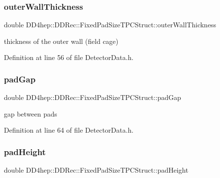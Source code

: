 \subsubsection{\texorpdfstring{outer\+Wall\+Thickness}{outerWallThickness}}
{\footnotesize\ttfamily double D\+D4hep\+::\+D\+D\+Rec\+::\+Fixed\+Pad\+Size\+T\+P\+C\+Struct\+::outer\+Wall\+Thickness}



thickness of the outer wall (field cage) 



Definition at line 56 of file Detector\+Data.\+h.

\hypertarget{struct_d_d4hep_1_1_d_d_rec_1_1_fixed_pad_size_t_p_c_struct_a28e26e987689e132b295e84586133520}{}\label{struct_d_d4hep_1_1_d_d_rec_1_1_fixed_pad_size_t_p_c_struct_a28e26e987689e132b295e84586133520} 
\subsubsection{\texorpdfstring{pad\+Gap}{padGap}}
{\footnotesize\ttfamily double D\+D4hep\+::\+D\+D\+Rec\+::\+Fixed\+Pad\+Size\+T\+P\+C\+Struct\+::pad\+Gap}



gap between pads 



Definition at line 64 of file Detector\+Data.\+h.

\hypertarget{struct_d_d4hep_1_1_d_d_rec_1_1_fixed_pad_size_t_p_c_struct_ab95a90cdaafbb23696608e1d1ad0df14}{}\label{struct_d_d4hep_1_1_d_d_rec_1_1_fixed_pad_size_t_p_c_struct_ab95a90cdaafbb23696608e1d1ad0df14} 
\subsubsection{\texorpdfstring{pad\+Height}{padHeight}}
{\footnotesize\ttfamily double D\+D4hep\+::\+D\+D\+Rec\+::\+Fixed\+Pad\+Size\+T\+P\+C\+Struct\+::pad\+Height}



